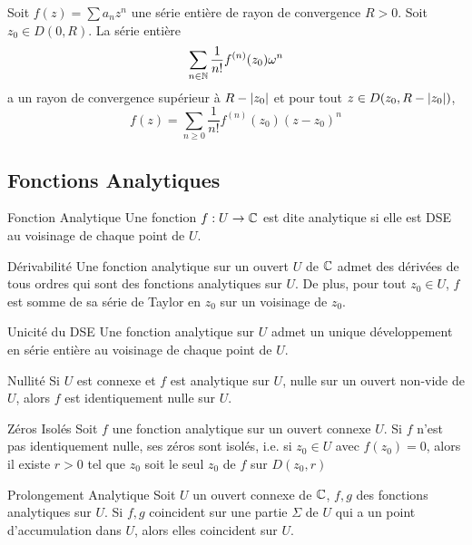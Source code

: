 \documentclass{cours}
\begin{document}
\begin{propositionfr}
    Soit $f(z) = \sum a_{n}z^{n}$ une série entière de rayon de convergence $R > 0$. Soit $z_{0} \in D(0, R)$. La série entière 
    \[
        \sum_{n \in \mathbb{N}}\frac{1}{n!}f^{(n)}(z_{0})\omega^{n}
    \]
    a un rayon de convergence supérieur à $R - \left|z_{0}\right|$ et pour tout $z \in D(z_{0}, R - \left|z_{0}\right|)$,
    \[
        f(z) = \sum_{n \geq 0} \frac{1}{n !}f^{(n)}(z_{0})(z - z_{0})^{n}
    \]
\end{propositionfr}

\subsection{Fonctions Analytiques}
\begin{définition}{Fonction Analytique}{}
    Une fonction $f : U \to \mathbb{C}$ est dite analytique si elle est DSE au voisinage de chaque point de $U$. 
\end{définition}

\begin{propositionfr}{Dérivabilité}{}
    Une fonction analytique sur un ouvert $U$ de $\mathbb{C}$ admet des dérivées de tous ordres qui sont des fonctions analytiques sur $U$. De plus, pour tout $z_{0} \in U$, $f$ est somme de sa série de Taylor en $z_{0}$ sur un voisinage de $z_{0}$.
\end{propositionfr}

\begin{corollaire}{Unicité du DSE}{}
    Une fonction analytique sur $U$ admet un unique développement en série entière au voisinage de chaque point de $U$.
\end{corollaire}

\begin{lemme}{Nullité}{}
    Si $U$ est connexe et $f$ est analytique sur $U$, nulle sur un ouvert non-vide de $U$, alors $f$ est identiquement nulle sur $U$. 
\end{lemme}

\begin{propositionfr}{Zéros Isolés}
    Soit $f$ une fonction analytique sur un ouvert connexe $U$. Si $f$ n'est pas identiquement nulle, ses zéros sont isolés, i.e. si $z_{0} \in U$ avec $f(z_{0}) = 0$, alors il existe $r > 0$ tel que $z_{0}$ soit le seul $z_{0}$ de $f$ sur $D(z_{0}, r)$
\end{propositionfr}

\begin{théorème}{Prolongement Analytique}{}
    Soit $U$ un ouvert connexe de $\mathbb{C}$, $f, g$ des fonctions analytiques sur $U$. Si $f, g$ coincident sur une partie $\Sigma$ de $U$ qui a un point d'accumulation dans $U$, alors elles coincident sur $U$. 
\end{théorème}
\end{document}
